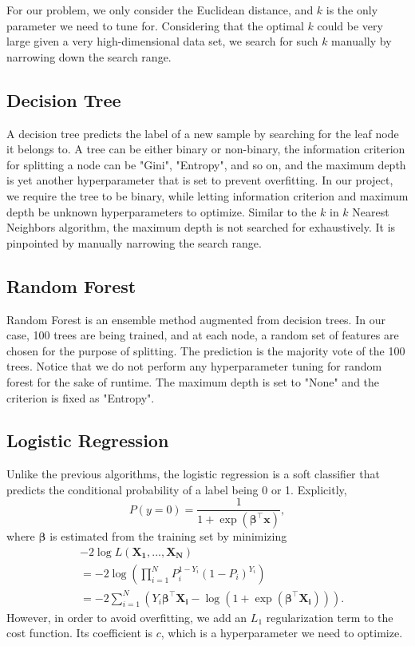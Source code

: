 \documentclass[10pt,twocolumn,letterpage]{article}
\begin{document}
	For our problem, we only consider the Euclidean distance, and $k$ is the only parameter we need to tune for. Considering that the optimal $k$ could be very large given a very high-dimensional data set, we search for such $k$ manually by narrowing down the search range.
	\subsection{Decision Tree}
	A decision tree predicts the label of a new sample by searching for the leaf node it belongs to. A tree can be either binary or non-binary, the information criterion for splitting a node can be "Gini", "Entropy", and so on, and the maximum depth is yet another hyperparameter that is set to prevent overfitting. In our project, we require the tree to be binary, while letting information criterion and maximum depth be unknown hyperparameters to optimize. Similar to the $k$ in $k$ Nearest Neighbors algorithm, the maximum depth is not searched for exhaustively. It is pinpointed by manually narrowing the search range.
	\subsection{Random Forest}
	Random Forest is an ensemble method augmented from decision trees. In our case, 100 trees are being trained, and at each node, a random set of features are chosen for the purpose of splitting. The prediction is the majority vote of the 100 trees. Notice that we do not perform any hyperparameter tuning for random forest for the sake of runtime. The maximum depth is set to "None" and the criterion is fixed as "Entropy".
	\subsection{Logistic Regression}
	Unlike the previous algorithms, the logistic regression is a soft classifier that predicts the conditional probability of a label being 0 or 1. Explicitly, 
	$$P(y = 0) = \frac{1}{1+\exp(\bm{\beta^\top}\bm{x})},$$ where $\bm{\beta}$ is estimated from the training set by minimizing \begin{align*}
	&-2\log L(\bm{X_1},...,\bm{X_N}) \\
	&= -2\log (\prod_{i=1}^{N}P_i^{1-Y_i}(1-P_i)^{Y_i})\\
	&= -2\sum_{i=1}^{N}(Y_i\bm{\beta}^\top\bm{X_i} - \log(1+\exp(\bm{\beta}^\top\bm{X_i}))).
	\end{align*} 
	However, in order to avoid overfitting, we add an $L_1$ regularization term to the cost function. Its coefficient is $c$, which is a hyperparameter we need to optimize.
\end{document}
